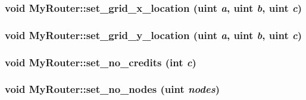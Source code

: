 \hypertarget{classMyRouter_684adfcb9dd9421f75372fe59b8ccc5f}{
\subsubsection[{set\_\-grid\_\-x\_\-location}]{\setlength{\rightskip}{0pt plus 5cm}void MyRouter::set\_\-grid\_\-x\_\-location ({\bf uint} {\em a}, \/  {\bf uint} {\em b}, \/  {\bf uint} {\em c})}}
\label{classMyRouter_684adfcb9dd9421f75372fe59b8ccc5f}


\hypertarget{classMyRouter_c5edbdd2f7da6b24f941540e687706c0}{
\subsubsection[{set\_\-grid\_\-y\_\-location}]{\setlength{\rightskip}{0pt plus 5cm}void MyRouter::set\_\-grid\_\-y\_\-location ({\bf uint} {\em a}, \/  {\bf uint} {\em b}, \/  {\bf uint} {\em c})}}
\label{classMyRouter_c5edbdd2f7da6b24f941540e687706c0}


\hypertarget{classMyRouter_1136c71870bd451ac24db24612071c92}{
\subsubsection[{set\_\-no\_\-credits}]{\setlength{\rightskip}{0pt plus 5cm}void MyRouter::set\_\-no\_\-credits (int {\em c})}}
\label{classMyRouter_1136c71870bd451ac24db24612071c92}


\hypertarget{classMyRouter_ceb204776c6ed1fcbc0179b1d57e0ba3}{
\subsubsection[{set\_\-no\_\-nodes}]{\setlength{\rightskip}{0pt plus 5cm}void MyRouter::set\_\-no\_\-nodes ({\bf uint} {\em nodes})}}
\label{classMyRouter_ceb204776c6ed1fcbc0179b1d57e0ba3}





